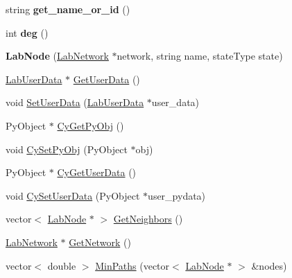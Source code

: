 \begin{DoxyCompactItemize}
\item 
\hypertarget{classelps_1_1_lab_node_a01b05c760cd150699c3583fc54d1333e}{string {\bfseries get\+\_\+name\+\_\+or\+\_\+id} ()}\label{classelps_1_1_lab_node_a01b05c760cd150699c3583fc54d1333e}

\item 
\hypertarget{classelps_1_1_lab_node_a4d12d87b8d10eee9f4c6e8d7c99dd36a}{int {\bfseries deg} ()}\label{classelps_1_1_lab_node_a4d12d87b8d10eee9f4c6e8d7c99dd36a}

\item 
\hypertarget{classelps_1_1_lab_node_a202920a51b673e00a2a41ee84bf1e45a}{{\bfseries Lab\+Node} (\hyperlink{classelps_1_1_lab_network}{Lab\+Network} $\ast$network, string name, state\+Type state)}\label{classelps_1_1_lab_node_a202920a51b673e00a2a41ee84bf1e45a}

\item 
\hyperlink{classelps_1_1_lab_user_data}{Lab\+User\+Data} $\ast$ \hyperlink{classelps_1_1_lab_node_a1060af83596bf32a69816a0be767746c}{Get\+User\+Data} ()
\item 
void \hyperlink{classelps_1_1_lab_node_a598cae3d92eec4d3a54978d23ec9c777}{Set\+User\+Data} (\hyperlink{classelps_1_1_lab_user_data}{Lab\+User\+Data} $\ast$user\+\_\+data)
\item 
Py\+Object $\ast$ \hyperlink{classelps_1_1_lab_node_adc6646cf0fc9a0d5e8aeaba99d30034a}{Cy\+Get\+Py\+Obj} ()
\item 
void \hyperlink{classelps_1_1_lab_node_af7ac6d6612aba25a73f8d4a1ae693559}{Cy\+Set\+Py\+Obj} (Py\+Object $\ast$obj)
\item 
Py\+Object $\ast$ \hyperlink{classelps_1_1_lab_node_aa8ccd0f20b0da85190f31409005d9592}{Cy\+Get\+User\+Data} ()
\item 
void \hyperlink{classelps_1_1_lab_node_a77480d27e0f32a56faeba4dc4b6160ad}{Cy\+Set\+User\+Data} (Py\+Object $\ast$user\+\_\+pydata)
\item 
vector$<$ \hyperlink{classelps_1_1_lab_node}{Lab\+Node} $\ast$ $>$ \hyperlink{classelps_1_1_lab_node_acbea44dd1db4d155dee1cf41a761ec08}{Get\+Neighbors} ()
\item 
\hyperlink{classelps_1_1_lab_network}{Lab\+Network} $\ast$ \hyperlink{classelps_1_1_lab_node_a602e29ffdcd887086f71ecf5c2c0332e}{Get\+Network} ()
\item 
vector$<$ double $>$ \hyperlink{classelps_1_1_lab_node_a6778f9219348111d876b56ec0dd97e9c}{Min\+Paths} (vector$<$ \hyperlink{classelps_1_1_lab_node}{Lab\+Node} $\ast$ $>$ \&nodes)
\end{DoxyCompactItemize}
